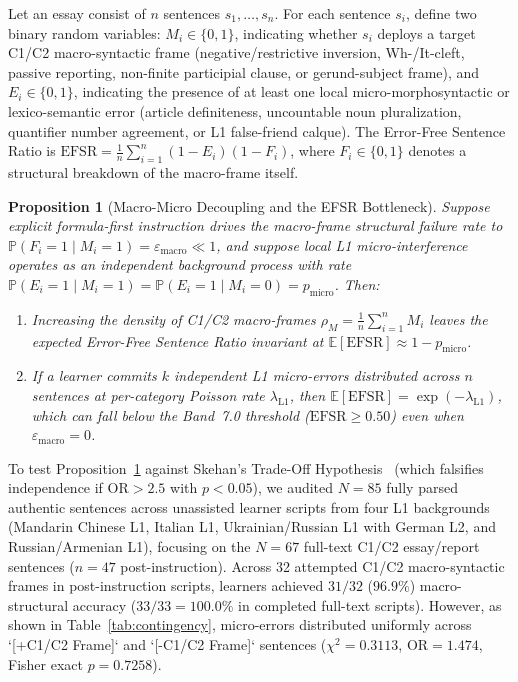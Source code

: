 \documentclass[11pt,reqno]{article}
\newtheorem{proposition}[theorem]{Proposition}
\begin{document}
Let an essay consist of $n$ sentences $s_1, \dots, s_n$. For each sentence $s_i$, define two binary random variables: $M_i \in \{0,1\}$, indicating whether $s_i$ deploys a target C1/C2 macro-syntactic frame (negative/restrictive inversion, Wh-/It-cleft, passive reporting, non-finite participial clause, or gerund-subject frame), and $E_i \in \{0,1\}$, indicating the presence of at least one local micro-morphosyntactic or lexico-semantic error (article definiteness, uncountable noun pluralization, quantifier number agreement, or L1 false-friend calque). The Error-Free Sentence Ratio is $\mathrm{EFSR} = \frac{1}{n}\sum_{i=1}^n (1 - E_i)(1 - F_i)$, where $F_i \in \{0,1\}$ denotes a structural breakdown of the macro-frame itself.

\begin{proposition}[Macro-Micro Decoupling and the EFSR Bottleneck]\label{prop:decoupling}
Suppose explicit formula-first instruction drives the macro-frame structural failure rate to $\mathbb{P}(F_i = 1 \mid M_i = 1) = \varepsilon_{\mathrm{macro}} \ll 1$, and suppose local L1 micro-interference operates as an independent background process with rate $\mathbb{P}(E_i = 1 \mid M_i = 1) = \mathbb{P}(E_i = 1 \mid M_i = 0) = p_{\mathrm{micro}}$. Then:
\begin{enumerate}
    \item Increasing the density of C1/C2 macro-frames $\rho_M = \frac{1}{n}\sum_{i=1}^n M_i$ leaves the expected Error-Free Sentence Ratio invariant at $\mathbb{E}[\mathrm{EFSR}] \approx 1 - p_{\mathrm{micro}}$.
    \item If a learner commits $k$ independent L1 micro-errors distributed across $n$ sentences at per-category Poisson rate $\lambda_{\mathrm{L1}}$, then $\mathbb{E}[\mathrm{EFSR}] = \exp(-\lambda_{\mathrm{L1}})$, which can fall below the Band~7.0 threshold ($\mathrm{EFSR} \ge 0.50$) even when $\varepsilon_{\mathrm{macro}} = 0$.
\end{enumerate}
\end{proposition}

To test Proposition~\ref{prop:decoupling} against Skehan's Trade-Off Hypothesis~\cite{Skehan1998} (which falsifies independence if $\mathrm{OR} > 2.5$ with $p < 0.05$), we audited $N=85$ fully parsed authentic sentences across unassisted learner scripts from four L1 backgrounds (Mandarin Chinese L1, Italian L1, Ukrainian/Russian L1 with German L2, and Russian/Armenian L1), focusing on the $N=67$ full-text C1/C2 essay/report sentences ($n=47$ post-instruction). Across 32 attempted C1/C2 macro-syntactic frames in post-instruction scripts, learners achieved $31/32$ ($96.9\%$) macro-structural accuracy ($33/33 = 100.0\%$ in completed full-text scripts). However, as shown in Table~\ref{tab:contingency}, micro-errors distributed uniformly across `[+C1/C2 Frame]` and `[-C1/C2 Frame]` sentences ($\chi^2 = 0.3113$, $\mathrm{OR} = 1.474$, Fisher exact $p = 0.7258$).
\end{document}
